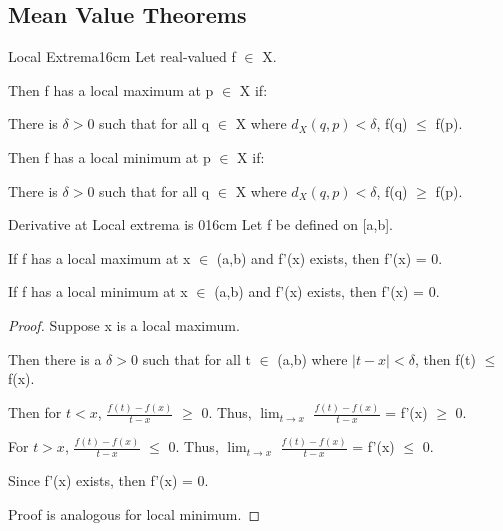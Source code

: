     \vspace{0.5cm}





\subsection{ Mean Value Theorems }

    \begin{definition}{Local Extrema}{16cm}
        Let real-valued f $\in$ X.
        
        Then f has a {\color{lblue} local maximum} at p $\in$ X if:
        
        \hspace{0.5cm}
        There is $\delta > 0$ such that for all q $\in$ X where $d_X(q,p) < \delta$,
        f(q) $\leq$ f(p).
        
        Then f has a {\color{lblue} local minimum} at p $\in$ X if:

        \hspace{0.5cm}
        There is $\delta > 0$ such that for all q $\in$ X where $d_X(q,p) < \delta$,
        f(q) $\geq$ f(p).
    \end{definition}

    \vspace{0.5cm}



    \begin{wtheorem}{Derivative at Local extrema is 0}{16cm}
        Let f be defined on [a,b].
        
        If f has a local maximum at x $\in$ (a,b) and f'(x) exists, then
        f'(x) = 0.

        If f has a local minimum at x $\in$ (a,b) and f'(x) exists, then
        f'(x) = 0.
    \end{wtheorem}

    \begin{proof}
        Suppose x is a local maximum.
        
        Then there is a $\delta > 0$ such that for all t $\in$ (a,b)
        where $|t - x| < \delta$, then f(t) $\leq$ f(x).

        Then for $t < x$, $\frac{f(t) - f(x)}{t - x}$ $\geq$ 0.
        Thus, $\lim_{t \rightarrow x}$ $\frac{f(t) - f(x)}{t - x}$ = f'(x) $\geq$ 0. 

        For $t > x$, $\frac{f(t) - f(x)}{t - x}$ $\leq$ 0.
        Thus, $\lim_{t \rightarrow x}$ $\frac{f(t) - f(x)}{t - x}$ = f'(x) $\leq$ 0.

        Since f'(x) exists, then f'(x) = 0.

        Proof is analogous for local minimum.
    \end{proof}

